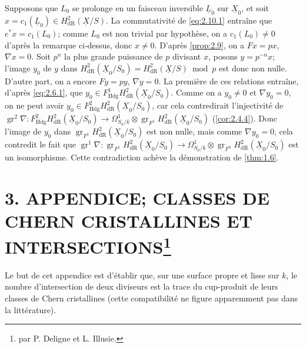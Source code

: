 \documentclass[10pt]{article}
\makeatletter
\DeclareMathOperator{\gr}{gr}
\newcommand{\Hdg}{\mathrm{Hdg}}
\newcommand{\UX}{\underline{X}}
\newcommand{\UL}{\underline{L}}
\newcommand{\sourceanchor}[2]{\begingroup\def\@currentlabel{#2}\label{#1}\endgroup}
\makeatother
\begin{document}
Supposons que $L_0$ se prolonge en un faisceau inversible $\UL_0$ sur $\UX_0$, et soit $x = c_1(\UL_0) \in H^2_{\mathrm{dR}}(\UX/S)$. La commutativité de \eqref{eq:2.10.1} entraîne que $e^*x = c_1(L_0)$; comme $L_0$ est non trivial par hypothèse, on a $c_1(L_0) \neq 0$ d'après la remarque ci-dessus, donc $x \neq 0$. D'après \ref{prop:2.9}, on a $Fx = px$, $\nabla x = 0$. Soit $p^n$ la plus grande puissance de $p$ divisant $x$, posons $y = p^{-n}x$; l'image $y_0$ de $y$ dans $H^2_{\mathrm{dR}}(\UX_0/S_0) = H^2_{\mathrm{dR}}(\UX/S) \bmod p$ est donc non nulle. D'autre part, on a encore $Fy = py$, $\nabla y = 0$. La première de ces relations entraîne, d'après \eqref{eq:2.6.1}, que $y_0 \in F^1_{\Hdg} H^2_{\mathrm{dR}}(\UX_0/S_0)$. Comme on a $y_0 \neq 0$ et $\nabla y_0 = 0$, on ne peut avoir $y_0 \in F^2_{\Hdg} H^2_{\mathrm{dR}}(\UX_0/S_0)$, car cela contredirait l'injectivité de $\gr^2 \nabla: F^2_{\Hdg} H^2_{\mathrm{dR}}(\UX_0/S_0) \to \Omega^1_{S_0/k} \otimes \gr_{F^1} H^2_{\mathrm{dR}}(\UX_0/S_0)$ (\ref{cor:2.4.4}). Donc l'image de $y_0$ dans $\gr_{F^1} H^2_{\mathrm{dR}}(\UX_0/S_0)$ est non nulle, mais comme $\nabla y_0 = 0$, cela contredit le fait que $\gr^1 \nabla: \gr_{F^1} H^2_{\mathrm{dR}}(\UX_0/S_0) \to \Omega^1_{S_0/k} \otimes \gr_{F^0} H^2_{\mathrm{dR}}(\UX_0/S_0)$ est un isomorphisme. Cette contradiction achève la démonstration de \ref{thm:1.6}.


\section*{3. APPENDICE; CLASSES DE CHERN CRISTALLINES ET INTERSECTIONS\footnote{par P. Deligne et L. Illusie.}}\sourceanchor{sec:3}{3}

Le but de cet appendice est d'établir que, sur une surface propre et lisse sur $k$, le nombre d'intersection de deux diviseurs est la trace du cup-produit de leurs classes de Chern cristallines (cette compatibilité ne figure apparemment pas dans la littérature).
\end{document}
